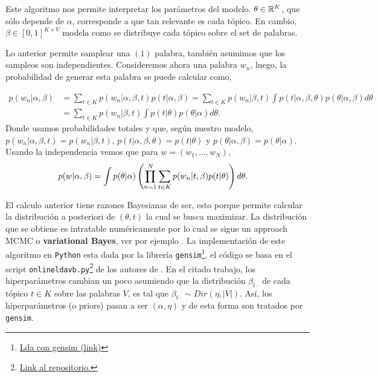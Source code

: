 \documentclass{article}
\begin{document}
	\begin{remark}
		Este algoritmo nos permite interpretar los parámetros del modelo. $\theta\in\mathbb{R}^{K}$, que sólo depende de $\alpha$, corresponde a que tan relevante es cada tópico. En cambio, $\beta\in[0,1]^{K\times V}$ modela como se distribuye cada tópico sobre el set de palabras. 
	\end{remark}
	
	Lo anterior permite samplear una $(1)$ palabra, también asumimos que los sampleos son independientes. Consideremos ahora una palabra $w_n$, luego, la probabilidad de generar esta palabra se puede calcular como,
	
	\begin{align*}
		p(w_n|\alpha, \beta) &= \sum_{t\in K} p(w_n|\alpha,\beta,t)p(t|\alpha,\beta)
		= \sum_{t\in K} p(w_n|\beta,t)\int p(t|\alpha,\beta,\theta)p(\theta|\alpha,\beta)d\theta\\
		&= \sum_{t\in K} p(w_n|\beta,t)\int p(t|\theta)p(\theta|\alpha)d\theta.
	\end{align*}
	Donde usamos probabilidades totales y que, según nuestro modelo, $p(w_n|\alpha,\beta,t)=p(w_n|\beta,t)$, $p(t|\alpha,\beta,\theta)=p(t|\theta)$ y $p(\theta|\alpha,\beta)=p(\theta|\alpha)$. Usando la independencia vemos que para $w=(w_1,...,w_N)$,  
	\begin{align*}
		p(w|\alpha,\beta) &= \int p(\theta|\alpha)\left(\prod_{n=1}^N \sum_{t\in K} p(w_n|t,\beta)p(t|\theta)\right) d\theta.
	\end{align*}
	
	El calculo anterior tiene razones Bayesianas de ser, esto porque permite calcular la distribución a posteriori de $(\theta, t)$ la cual se busca maximizar. La distribución que se obtiene es intratable numéricamente por lo cual se sigue un approach MCMC o \textbf{variational Bayes}, ver por ejemplo \cite{LDA03, LDA10}. La implementación de este algoritmo en \texttt{Python} esta dada por la librería \texttt{gensim}\footnote{\href{https://radimrehurek.com/gensim/models/ldamodel.html}{Lda con gensim (link)}}, el código se basa en el script \texttt{onlineldavb.py}\footnote{\href{https://github.com/blei-lab/onlineldavb/blob/master/onlineldavb.py}{Link al repositorio.}} de los autores de \cite{LDA10}. En el citado trabajo, los hiperparámetros cambian un poco asumiendo que la distribución $\beta_{t\cdot}$ de cada tópico $t\in K$ sobre las palabras $V$, es tal que $\beta_{t\cdot}\sim Dir(\eta, |V|)$. Así, los hiperparámetros (o priors) pasan a ser $(\alpha,\eta)$ y de esta forma son tratados por \texttt{gensim}.\\ 
	
\end{document}
